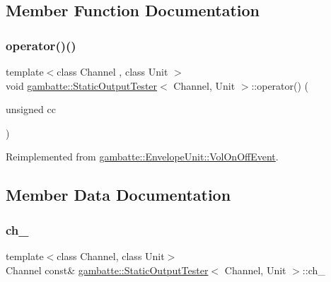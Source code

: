 \subsection{Member Function Documentation}
\mbox{\label{classgambatte_1_1StaticOutputTester_a133c2bb69dd470d954954d4518dcdd4c}} 
\subsubsection{\texorpdfstring{operator()()}{operator()()}}
{\footnotesize\ttfamily template$<$class Channel , class Unit $>$ \\
void \hyperlink{classgambatte_1_1StaticOutputTester}{gambatte\+::\+Static\+Output\+Tester}$<$ Channel, Unit $>$\+::operator() (\begin{DoxyParamCaption}\item[{unsigned}]{cc }\end{DoxyParamCaption})\hspace{0.3cm}{\ttfamily [virtual]}}



Reimplemented from \hyperlink{structgambatte_1_1EnvelopeUnit_1_1VolOnOffEvent_a51a53f7c8e454be01a67e82a33dcf5ee}{gambatte\+::\+Envelope\+Unit\+::\+Vol\+On\+Off\+Event}.



\subsection{Member Data Documentation}
\mbox{\label{classgambatte_1_1StaticOutputTester_a8c8666e9c317a775779c40bc2f7dda5d}} 
\subsubsection{\texorpdfstring{ch\+\_\+}{ch\_}}
{\footnotesize\ttfamily template$<$class Channel, class Unit$>$ \\
Channel const\& \hyperlink{classgambatte_1_1StaticOutputTester}{gambatte\+::\+Static\+Output\+Tester}$<$ Channel, Unit $>$\+::ch\+\_\+\hspace{0.3cm}{\ttfamily [private]}}

